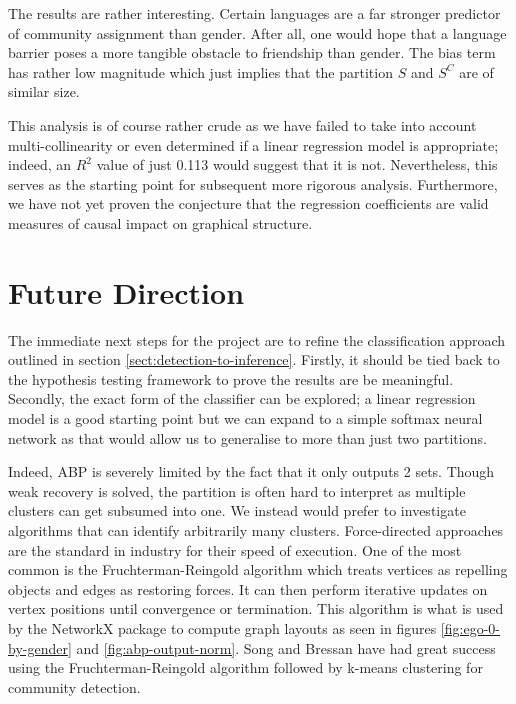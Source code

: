 \documentclass[11pt]{article}
\begin{document}
\begin{multicols*}{2}
The results are rather interesting. Certain languages are a far stronger predictor of community assignment than gender. After all, one would hope that a language barrier poses a more tangible obstacle to friendship than gender. The bias term has rather low magnitude which just implies that the partition $S$ and $S^C$ are of similar size.

This analysis is of course rather crude as we have failed to take into account multi-collinearity or even determined if a linear regression model is appropriate; indeed, an $R^2$ value of just 0.113 would suggest that it is not. Nevertheless, this serves as the starting point for subsequent more rigorous analysis. Furthermore, we have not yet proven the conjecture that the regression coefficients are valid measures of causal impact on graphical structure.

\pagebreak
\section{Future Direction}

The immediate next steps for the project are to refine the classification approach outlined in section \ref{sect:detection-to-inference}. Firstly, it should be tied back to the hypothesis testing framework to prove the results are be meaningful. Secondly, the exact form of the classifier can be explored; a linear regression model is a good starting point but we can expand to a simple softmax neural network as that would allow us to generalise to more than just two partitions.

Indeed, ABP is severely limited by the fact that it only outputs 2 sets. Though weak recovery is solved, the partition is often hard to interpret as multiple clusters can get subsumed into one. We instead would prefer to investigate algorithms that can identify arbitrarily many clusters. Force-directed approaches are the standard in industry for their speed of execution. One of the most common is the Fruchterman-Reingold algorithm which treats vertices as repelling objects and edges as restoring forces. It can then perform iterative updates on vertex positions until convergence or termination. This algorithm is what is used by the NetworkX package \cite{networkx} to compute graph layouts as seen in figures \ref{fig:ego-0-by-gender} and \ref{fig:abp-output-norm}. Song and Bressan \cite{force-directed} have had great success using the Fruchterman-Reingold algorithm followed by k-means clustering for community detection.


\end{multicols*}
\end{document}
